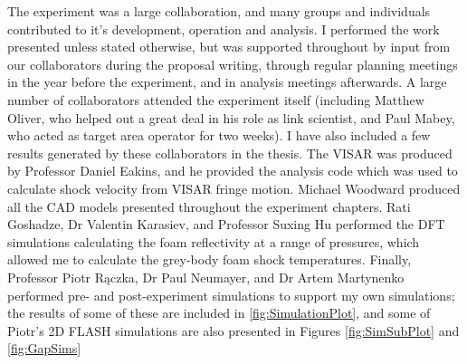 The experiment was a large collaboration, and many groups and individuals contributed to it's development, operation and analysis. I performed the work presented unless stated otherwise, but was supported throughout by input from our collaborators during the proposal writing, through regular planning meetings in the year before the experiment, and in analysis meetings afterwards. A large number of collaborators attended the experiment itself (including Matthew Oliver, who helped out a great deal in his role as link scientist, and Paul Mabey, who acted as target area operator for two weeks). I have also included a few results generated by these collaborators in the thesis. The VISAR was produced by Professor Daniel Eakins, and he provided the analysis code which was used to calculate shock velocity from VISAR fringe motion. Michael Woodward produced all the CAD models presented throughout the experiment chapters. Rati Goshadze, Dr Valentin  Karasiev, and Professor Suxing Hu performed the DFT simulations calculating the foam reflectivity at a range of pressures, which allowed me to calculate the grey-body foam shock temperatures. Finally, Professor Piotr R\k{a}czka, Dr Paul Neumayer, and Dr Artem Martynenko performed pre- and post-experiment simulations to support my own simulations; the results of some of these are included in \ref{fig:SimulationPlot}, and some of Piotr's 2D FLASH simulations are also presented in Figures \ref{fig:SimSubPlot} and \ref{fig:GapSims}


